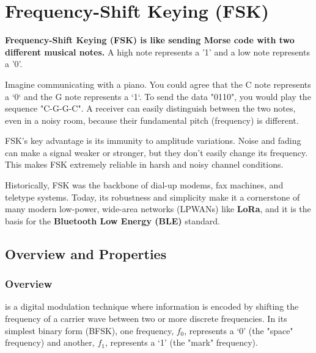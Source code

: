 
\chapter{Frequency-Shift Keying (FSK)}
\label{ch:fsk}

\begin{nontechnical}
    \textbf{Frequency-Shift Keying (FSK) is like sending Morse code with two different musical notes.} A high note represents a '1' and a low note represents a '0'.

     Imagine communicating with a piano. You could agree that the C note represents a `0` and the G note represents a `1`. To send the data "0110", you would play the sequence "C-G-G-C". A receiver can easily distinguish between the two notes, even in a noisy room, because their fundamental pitch (frequency) is different.

     FSK's key advantage is its immunity to amplitude variations. Noise and fading can make a signal weaker or stronger, but they don't easily change its frequency. This makes FSK extremely reliable in harsh and noisy channel conditions.

     Historically, FSK was the backbone of dial-up modems, fax machines, and teletype systems. Today, its robustness and simplicity make it a cornerstone of many modern low-power, wide-area networks (LPWANs) like \textbf{LoRa}, and it is the basis for the \textbf{Bluetooth Low Energy (BLE)} standard.
\end{nontechnical}


\section{Overview and Properties}

\subsection{Overview}

 is a digital modulation technique where information is encoded by shifting the frequency of a carrier wave between two or more discrete frequencies. In its simplest binary form (BFSK), one frequency, $f_0$, represents a `0' (the "space" frequency) and another, $f_1$, represents a `1' (the "mark" frequency).

